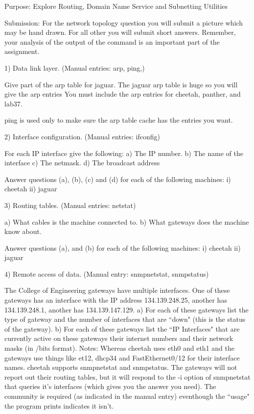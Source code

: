 

\nopagenumbers
{}
\parindent 0pt


Purpose: Explore Routing, Domain Name Service and Subnetting Utilities

Submission: 
For the network topology question you will submit a picture which may be hand 
drawn. 
For all other you will submit short answers.
Remember, your analysis of the output of the command is an important part
of the assignment.

1)
Data link layer.
(Manual entries: arp, ping,)

Give part of the arp table for jaguar.
The jaguar arp table is huge so you will give the arp entries
You must include the arp entries for cheetah, panther, and lab37.

ping is used only to make sure the arp table cache has the entries you want.

\vfill
2) Interface configuration. (Manual entries: ifconfig)

For each IP interface give the following:
a) The IP number.
b) The name of the interface
c) The netmask.
d) The broadcast address

Answer questions (a), (b), (c) and (d) for each of the following machines:
\hfil\break
i) cheetah
\hskip1in
ii) jaguar
\hfil\break

\vfill
3) Routing tables. (Manual entries: netstat)

a) What cables is the machine connected to.
b) What gateways does the machine know about.

Answer questions (a), and (b) for each of the following machines:
\hfil\break
i) cheetah
\hskip1in
ii) jaguar
\hskip1in

\vfill
4) Remote access of data.
(Manual entry: snmpnetstat, snmpstatus)

The College of Engineering gateways have multiple interfaces.
One of these gateways has an interface with the IP address 134.139.248.25,
another has 134.139.248.1, another has 134.139.147.129.
a) For each of these gateways list the type of gateway and the
number of interfaces that are ``down" (this is the status of
the gateway).
b) For each of these gateways list
the ``IP Interfaces" that are currently active on these gateways
their internet numbers and their network masks (in /bits format).
Notes: Whereas cheetah uses eth0 and eth1 and the
gateways use things like et12, dhcp34 and FastEthernet0/12 for
their interface names.
{\ltt{}cheetah} supports snmpnetstat and snmpstatus.
The gateways will not report out their routing tables,
but it will respond to the {\ltt{}-i} option of {\ltt{}snmpnetstat}
that queries it's interfaces (which gives you the answer you need).
The community is required (as indicated in the manual entry)
eventhough the ``usage" the program prints indicates it isn't.

